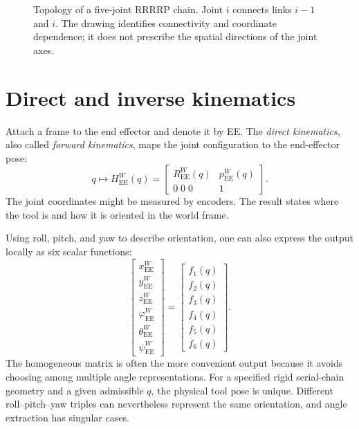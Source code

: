 \begin{figure}[htbp]
\centering
\caption{Topology of a five-joint RRRRP chain. Joint $i$ connects links
$i-1$ and $i$. The drawing identifies connectivity and coordinate dependence;
it does not prescribe the spatial directions of the joint axes.}
\label{fig:l10-chain}
\end{figure}

\section{Direct and inverse kinematics}
Attach a frame to the end effector and denote it by EE. The
\emph{direct kinematics}, also called \emph{forward kinematics}, maps the
joint configuration to the end-effector pose:
\begin{equation}
 q\longmapsto H_{\mathrm{EE}}^W(q)
 =\begin{bmatrix}
 R_{\mathrm{EE}}^W(q)&p_{\mathrm{EE}}^W(q)\\
 0\;0\;0&1
 \end{bmatrix}.
 \label{eq:l10-direct}
\end{equation}
The joint coordinates might be measured by encoders. The result states
where the tool is and how it is oriented in the world frame.

Using roll, pitch, and yaw to describe orientation, one can also express
the output locally as six scalar functions:
\[
 \begin{bmatrix}x_{\mathrm{EE}}^W\\y_{\mathrm{EE}}^W\\z_{\mathrm{EE}}^W\\
 \varphi_{\mathrm{EE}}^W\\\theta_{\mathrm{EE}}^W\\\psi_{\mathrm{EE}}^W
 \end{bmatrix}
 =\begin{bmatrix}f_1(q)\\f_2(q)\\f_3(q)\\f_4(q)\\f_5(q)\\f_6(q)\end{bmatrix}.
\]
The homogeneous matrix is often the more convenient output because it
avoids choosing among multiple angle representations. For a specified
rigid serial-chain geometry and a given admissible $q$, the physical tool
pose is unique. Different roll--pitch--yaw triples can nevertheless represent
the same orientation, and angle extraction has singular cases.

